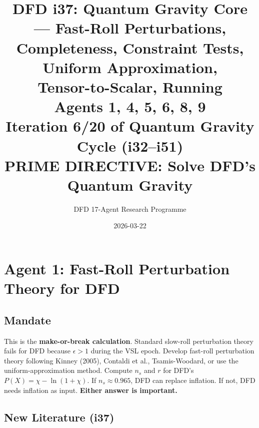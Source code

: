 \documentclass[11pt,a4paper]{article}
\title{DFD i37: Quantum Gravity Core --- Fast-Roll Perturbations,\\Completeness, Constraint Tests, Uniform Approximation,\\Tensor-to-Scalar, Running\\[6pt]
\large Agents 1, 4, 5, 6, 8, 9\\[6pt]
\normalsize Iteration 6/20 of Quantum Gravity Cycle (i32--i51)\\
PRIME DIRECTIVE: Solve DFD's Quantum Gravity}
\author{DFD 17-Agent Research Programme}
\date{2026-03-22}
\begin{document}
\maketitle
\tableofcontents
\newpage

\section{Agent 1: Fast-Roll Perturbation Theory for DFD}
\label{sec:agent1}

\subsection{Mandate}

This is the \textbf{make-or-break calculation}. Standard slow-roll perturbation theory fails for DFD because $\epsilon > 1$ during the VSL epoch. Develop fast-roll perturbation theory following Kinney (2005), Contaldi et al., Tsamis-Woodard, or use the uniform-approximation method. Compute $n_s$ and $r$ for DFD's $P(X) = \chi - \ln(1+\chi)$. If $n_s \approx 0.965$, DFD can replace inflation. If not, DFD needs inflation as input. \textbf{Either answer is important.}

\subsection{New Literature (i37)}
\end{document}
